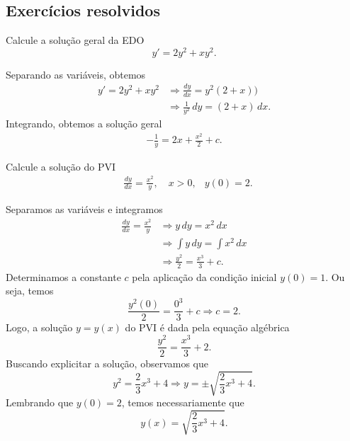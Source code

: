 \subsection*{Exercícios resolvidos}

\begin{exeresol}
  Calcule a solução geral da EDO
  \begin{equation}
    y' = 2y^2 + xy^2.
  \end{equation}
\end{exeresol}
\begin{resol}
  Separando as variáveis, obtemos
  \begin{align}
    y' = 2y^2 + xy^2 &\Rightarrow \frac{dy}{dx} = y^2(2 + x)) \\
                     &\Rightarrow \frac{1}{y^2}\,dy = (2+x)\,dx.
  \end{align}
  Integrando, obtemos a solução geral
  \begin{align}
    -\frac{1}{y} = 2x + \frac{x^2}{2} + c.
  \end{align}
\end{resol}

\begin{exeresol}
  Calcule a solução do PVI
  \begin{align}
    &\frac{dy}{dx} = \frac{x^2}{y},\quad x>0,
    &y(0) = 2.
  \end{align}
\end{exeresol}
\begin{resol}
  Separamos as variáveis e integramos
  \begin{align}
    \frac{dy}{dx} = \frac{x^2}{y} &\Rightarrow y\,dy = x^2\,dx \\
                                  &\Rightarrow \int y\,dy = \int x^2\,dx \\
                                  &\Rightarrow \frac{y^2}{2} = \frac{x^3}{3} + c.
  \end{align}
  Determinamos a constante $c$ pela aplicação da condição inicial $y(0) = 1$. Ou seja, temos
  \begin{equation}
    \frac{y^2(0)}{2} = \frac{0^3}{3} + c \Rightarrow c = 2.
  \end{equation}
  Logo, a solução $y = y(x)$ do PVI é dada pela equação algébrica
  \begin{equation}
    \frac{y^2}{2} = \frac{x^3}{3} + 2.
  \end{equation}
  Buscando explicitar a solução, observamos que
  \begin{equation}
    y^2 = \frac{2}{3}x^3 + 4 \Rightarrow y = \pm\sqrt{\frac{2}{3}x^3+4}.
  \end{equation}
  Lembrando que $y(0) = 2$, temos necessariamente que
  \begin{equation}
    y(x) = \sqrt{\frac{2}{3}x^3 + 4}.
  \end{equation}
\end{resol}

